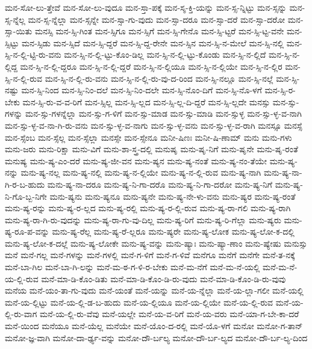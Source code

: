{ಮನ-ಸೋ-ಲು-ತ್ತೇವೆ
ಮನ-ಸೋ-ಲು-ವುದೂ
ಮನ-ಸ್ತಾ-ಪಕ್ಕೆ
ಮನ-ಸ್ಶ-ಕ್ತಿ-ಯನ್ನು
ಮನ-ಸ್ಸ-ನ್ನಿಟ್ಟು
ಮನ-ಸ್ಸನ್ನು
ಮನ-ಸ್ಸ-ನ್ನೆಲ್ಲ
ಮನ-ಸ್ಸ-ನ್ನೆಲ್ಲಾ
ಮನ-ಸ್ಸನ್ನೇ
ಮನ-ಸ್ಸಾ-ಗು-ವುದು
ಮನ-ಸ್ಸಾ-ದರೂ
ಮನ-ಸ್ಸಾ-ದರೆ
ಮನ-ಸ್ಸಾ-ದರೋ
ಮನ-ಸ್ಸಾ-ಯಿತು
ಮನಸ್ಸಿ
ಮನ-ಸ್ಸಿ-ಗಿಂತ
ಮನ-ಸ್ಸಿಗೂ
ಮನ-ಸ್ಸಿಗೆ
ಮನ-ಸ್ಸಿ-ಗೇನೊ
ಮನ-ಸ್ಸಿ-ಟ್ಟರೆ
ಮನ-ಸ್ಸಿ-ಟ್ಟ-ವನೇ
ಮನ-ಸ್ಸಿಟ್ಟು
ಮನ-ಸ್ಸಿಡು
ಮನ-ಸ್ಸಿದೆ
ಮನ-ಸ್ಸಿ-ದ್ದರೆ
ಮನ-ಸ್ಸಿ-ದ್ದ-ರೇನೇ
ಮನ-ಸ್ಸಿನ
ಮನ-ಸ್ಸಿ-ನ-ಮೇಲೆ
ಮನ-ಸ್ಸಿ-ನಲ್ಲಿ
ಮನ-ಸ್ಸಿ-ನ-ಲ್ಲಿ-ಟ್ಟಿ-ರು-ವನು
ಮನ-ಸ್ಸಿ-ನ-ಲ್ಲಿ-ಟ್ಟು-ಕೊಂ-ಡಿಲ್ಲ
ಮನ-ಸ್ಸಿ-ನ-ಲ್ಲಿ-ಟ್ಟು-ಕೊಂಡು
ಮನ-ಸ್ಸಿ-ನ-ಲ್ಲಿದೆ
ಮನ-ಸ್ಸಿ-ನ-ಲ್ಲಿದ್ದ
ಮನ-ಸ್ಸಿ-ನ-ಲ್ಲಿ-ದ್ದರೂ
ಮನ-ಸ್ಸಿ-ನ-ಲ್ಲಿ-ದ್ದರೆ
ಮನ-ಸ್ಸಿ-ನ-ಲ್ಲಿಯೂ
ಮನ-ಸ್ಸಿ-ನ-ಲ್ಲಿಯೇ
ಮನ-ಸ್ಸಿ-ನ-ಲ್ಲಿರ
ಮನ-ಸ್ಸಿ-ನ-ಲ್ಲಿ-ರುವ
ಮನ-ಸ್ಸಿ-ನ-ಲ್ಲಿ-ರು-ವನು
ಮನ-ಸ್ಸಿ-ನ-ಲ್ಲಿ-ರು-ವು-ದ-ರಿಂದ
ಮನ-ಸ್ಸಿ-ನಲ್ಲೂ
ಮನ-ಸ್ಸಿ-ನಲ್ಲೆ
ಮನ-ಸ್ಸಿ-ನಷ್ಟು
ಮನ-ಸ್ಸಿ-ನಿಂದ
ಮನ-ಸ್ಸಿ-ನಿಂ-ದಲೆ
ಮನ-ಸ್ಸಿ-ನಿಂ-ದಲೇ
ಮನ-ಸ್ಸಿ-ನೊಂ-ದಿಗೆ
ಮನ-ಸ್ಸಿ-ನೊ-ಳಗೆ
ಮನ-ಸ್ಸಿ-ರ-ಬೇಕು
ಮನ-ಸ್ಸಿ-ರು-ವ-ವ-ರಿಗೆ
ಮನ-ಸ್ಸಿಲ್ಲ
ಮನ-ಸ್ಸಿ-ಲ್ಲದ
ಮನ-ಸ್ಸಿ-ಲ್ಲ-ದಿ-ದ್ದರೆ
ಮನ-ಸ್ಸಿ-ಲ್ಲದೇ
ಮನಸ್ಸು
ಮನ-ಸ್ಸು-ಗಳನ್ನು
ಮನ-ಸ್ಸು-ಗಳನ್ನೆಲ್ಲಾ
ಮನ-ಸ್ಸು-ಗ-ಳಿಗೆ
ಮನ-ಸ್ಸು-ಮಾಡ
ಮನ-ಸ್ಸು-ಮಾಡಿ
ಮನ-ಸ್ಸುಳ್ಳ
ಮನ-ಸ್ಸು-ಳ್ಳ-ವ-ನಾಗಿ
ಮನ-ಸ್ಸು-ಳ್ಳ-ವ-ನಾ-ಗಿ-ರು-ವನು
ಮನ-ಸ್ಸು-ಳ್ಳ-ವ-ನಾಗು
ಮನ-ಸ್ಸು-ಳ್ಳ-ವನು
ಮನ-ಸ್ಸು-ಳ್ಳ-ವ-ರಾಗಿ
ಮನಸ್ಸೂ
ಮನಸ್ಸೆ
ಮನ-ಸ್ಸೆಂಬ
ಮನ-ಸ್ಸೆಲ್ಲ
ಮನ-ಸ್ಸೆಲ್ಲಾ
ಮನಸ್ಸೇ
ಮನ-ಸ್ಸೇನೂ
ಮನೀ-ಷಿಣಃ
ಮನೀ-ಷಿ-ಣಾಮ್
ಮನು
ಮನು-ಗಳು
ಮನು-ಜರು
ಮನು-ರಿಕ್ಷಾ
ಮನು-ವಿಗೆ
ಮನು-ಶಾ-ಸ್ತ್ರ-ದಲ್ಲಿ
ಮನುಷೃ
ಮನು-ಷೃ-ನಿಗೆ
ಮನು-ಷೃನೇ
ಮನು-ಷೃ-ರಂತೆ
ಮನುಷ್ಯ
ಮನು-ಷ್ಯ-ಎಂ-ದರೆ
ಮನು-ಷ್ಯ-ಜೀ-ವನ
ಮನು-ಷ್ಯನ
ಮನು-ಷ್ಯ-ನಂತೆ
ಮನು-ಷ್ಯ-ನಂ-ತೆಯೇ
ಮನು-ಷ್ಯ-ನನ್ನು
ಮನು-ಷ್ಯ-ನಲ್ಲ
ಮನು-ಷ್ಯ-ನಲ್ಲಿ
ಮನು-ಷ್ಯ-ನ-ಲ್ಲಿಯೇ
ಮನು-ಷ್ಯ-ನ-ಲ್ಲಿ-ರುವ
ಮನು-ಷ್ಯ-ನಾಗಿ
ಮನು-ಷ್ಯ-ನಾ-ಗಿ-ರ-ಬ-ಹುದು
ಮನು-ಷ್ಯ-ನಾ-ದರೂ
ಮನು-ಷ್ಯ-ನಿ-ಗಾ-ದರೊ
ಮನು-ಷ್ಯ-ನಿ-ಗಾ-ದರೋ
ಮನು-ಷ್ಯ-ನಿಗೆ
ಮನು-ಷ್ಯ-ನಿ-ಗೊ-ಬ್ಬ-ನಿಗೇ
ಮನು-ಷ್ಯನು
ಮನು-ಷ್ಯನೂ
ಮನು-ಷ್ಯನೇ
ಮನು-ಷ್ಯ-ನೇ-ಳು-ವನು
ಮನು-ಷ್ಯರ
ಮನು-ಷ್ಯ-ರಂತೆ
ಮನು-ಷ್ಯ-ರನ್ನು
ಮನು-ಷ್ಯ-ರ-ಲ್ಲದ
ಮನು-ಷ್ಯ-ರಲ್ಲಿ
ಮನು-ಷ್ಯ-ರ-ಲ್ಲಿ-ರುವ
ಮನು-ಷ್ಯ-ರಾ-ಗಲಿ
ಮನು-ಷ್ಯ-ರಾಗಿ
ಮನು-ಷ್ಯ-ರಾ-ಗಿ-ರು-ವುದನ್ನು
ಮನು-ಷ್ಯ-ರಾ-ಗು-ವು-ದಿಲ್ಲ
ಮನು-ಷ್ಯ-ರಿಗೆ
ಮನು-ಷ್ಯ-ರಿ-ಗೆಲ್ಲಾ
ಮನು-ಷ್ಯರು
ಮನು-ಷ್ಯ-ರೂ-ಪ-ವನ್ನು
ಮನು-ಷ್ಯ-ರೆಲ್ಲ
ಮನು-ಷ್ಯ-ರೆ-ಲ್ಲರೂ
ಮನು-ಷ್ಯರೇ
ಮನು-ಷ್ಯ-ಲೋಕ
ಮನು-ಷ್ಯ-ಲೋ-ಕ-ದಲ್ಲಿ
ಮನು-ಷ್ಯ-ಲೋ-ಕ-ದಲ್ಲೆ
ಮನು-ಷ್ಯ-ಲೋಕೇ
ಮನು-ಷ್ಯ-ವನ್ನು
ಮನು-ಷ್ಯಾಃ
ಮನು-ಷ್ಯಾ-ಣಾಂ
ಮನು-ಷ್ಯೇಷು
ಮನುಸ್ಸು
ಮನೆ
ಮನೆ-ಗಲ್ಲ
ಮನೆ-ಗಳನ್ನು
ಮನೆ-ಗಳಲ್ಲಿ
ಮನೆ-ಗ-ಳಿಗೆ
ಮನೆ-ಗ-ಳಿವೆ
ಮನೆಗೂ
ಮನೆಗೆ
ಮನೆಗೇ
ಮನೆ-ತ-ನಕ್ಕೆ
ಮನೆ-ಬಾ-ಗಿಲ
ಮನೆ-ಬಾ-ಗಿ-ಲನ್ನು
ಮನೆ-ಮ-ಠ-ಗ-ಳಿ-ರ-ಬೇಕು
ಮನೆ-ಮ-ನೆಗೆ
ಮನೆ-ಮ-ನೆ-ಯಲ್ಲಿ
ಮನೆ-ಮ-ನೆ-ಯ-ಲ್ಲಿ-ರುವ
ಮನೆ-ಮಾ-ಡಿ-ಕೊಂ-ಡಿತು
ಮನೆ-ಮಾ-ಡಿ-ಕೊಂ-ಡಿ-ರು-ವುದು
ಮನೆ-ಮಾ-ಡಿ-ಕೊಂ-ಡಿ-ರು-ವುವು
ಮನೆಯ
ಮನೆ-ಯಂ-ತಾ-ಗು-ವುದು
ಮನೆ-ಯಂತೆ
ಮನೆ-ಯನ್ನು
ಮನೆ-ಯ-ನ್ನೆಲ್ಲಾ
ಮನೆ-ಯ-ಲ್ಲಾ-ಗಲೀ
ಮನೆ-ಯಲ್ಲಿ
ಮನೆ-ಯ-ಲ್ಲಿಟ್ಟು
ಮನೆ-ಯ-ಲ್ಲಿ-ಡ-ಬ-ಹುದು
ಮನೆ-ಯ-ಲ್ಲಿಯೂ
ಮನೆ-ಯ-ಲ್ಲಿಯೇ
ಮನೆ-ಯ-ಲ್ಲಿ-ರುವ
ಮನೆ-ಯ-ಲ್ಲಿ-ರು-ವಾಗ
ಮನೆ-ಯ-ಲ್ಲಿ-ರು-ವೆವು
ಮನೆ-ಯಲ್ಲೇ
ಮನೆ-ಯ-ವ-ರಿಗೆ
ಮನೆ-ಯ-ವರು
ಮನೆ-ಯಾ-ಗ-ಬೇ-ಕಾ-ದರೆ
ಮನೆ-ಯಿಂದ
ಮನೆಯೂ
ಮನೆ-ಯೆಲ್ಲ
ಮನೆಯೇ
ಮನೆ-ಯೊಂ-ದ-ರಲ್ಲಿ
ಮನೆ-ಯೊ-ಳಗೆ
ಮನೋ
ಮನೋ-ಗ-ತಾನ್
ಮನೋ-ಜ್ಞ-ವಾಗಿ
ಮನೋ-ದಾ-ರ್ಢ್ಯ-ವನ್ನು
ಮನೋ-ದೌ-ರ್ಬಲ್ಯ
ಮನೋ-ದೌ-ರ್ಬ-ಲ್ಯದ
ಮನೋ-ದೌ-ರ್ಬ-ಲ್ಯ-ದಿಂದ
}
